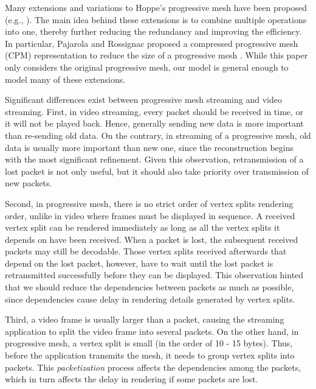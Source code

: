     Many extensions and variations to Hoppe's
    progressive mesh have been proposed (e.g.,
    \cite{614450,319358,383281,multiresolution:chen}).  The main idea
    behind these extensions is to combine multiple
    operations into one, thereby further reducing the
    redundancy and improving the efficiency. In particular, Pajarola and 
    Rossignac proposed a compressed progressive mesh (CPM) representation to reduce
    the size of a progressive mesh \cite{614450}. While this paper
    only considers the original progressive mesh, our
    model is general enough to model many of these
    extensions. 

    Significant differences exist between progressive mesh
    streaming and video streaming.  First, in video streaming,
    every packet should be received in time, or it will not
    be played back.  Hence, generally sending new data is more
    important than re-sending old data. On the contrary,
    in streaming of a progressive mesh, old data is
    usually more important than new one, since the
    reconstruction begins with the most significant refinement.
    Given this observation, retransmission of a lost packet is
    not only useful, but it should also take priority
    over transmission of new packets.

    Second, in progressive mesh, there is no strict order
    of vertex splits rendering order, unlike in video where
    frames must be displayed in sequence. A received vertex split
    can be rendered immediately as long as all the vertex splits
    it depends on have been received.  When a packet is lost, the
    subsequent received packets may still be decodable.  Those
    vertex splits received afterwards that depend on the
    lost packet, however, have to wait until the lost packet
    is retransmitted successfully before they can be displayed.
    This observation hinted that we should reduce the dependencies
    between packets as much as possible, since dependencies cause
    delay in rendering details generated by vertex splits.

    Third, a video frame is usually larger than a packet,
    causing the streaming application to split the video frame
    into several packets.  On the other hand, in progressive mesh,
    a vertex split is small (in the order of 10 - 15 bytes).  Thus,
    before the application transmits the mesh, it needs to group
    vertex splits into packets.   This \textit{packetization}
    process affects the dependencies among the packets, which in
    turn affects the delay in rendering if some packets are lost.
\\
